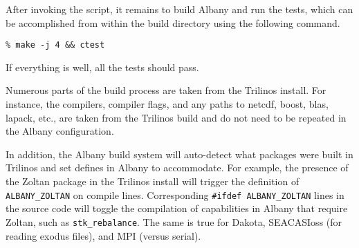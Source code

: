 \documentclass[pdf,12pt,report,strict]{SANDreport}
\theoremstyle{remark}
\begin{document}
After invoking the script, it remains to build Albany and run the
tests, which can be accomplished from within the build directory using
the following command.
\begin{verbatim}
% make -j 4 && ctest
\end{verbatim}
If everything is well, all the tests should pass. 

Numerous parts of the build process are taken from the Trilinos install.
For instance, the compilers, compiler flags, and any paths to netcdf,
boost, blas, lapack, etc., are taken from the Trilinos build and do not
need to be repeated in the Albany configuration.

In addition, the Albany build system will auto-detect what packages 
were built in Trilinos and set defines in Albany to accommodate.
For example, the presence of the Zoltan package in the Trilinos install
will trigger the definition of \texttt{ALBANY\_ZOLTAN}  on compile lines. 
Corresponding \texttt{\#ifdef ALBANY\_ZOLTAN} lines in the source code
will toggle the compilation of capabilities in Albany that require
Zoltan, such as \texttt{stk\_rebalance}. The same is true for Dakota,
SEACASIoss (for reading exodus files), and MPI (versus serial).
\end{document}
